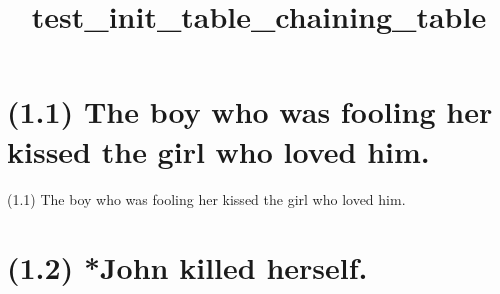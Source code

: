 \documentclass{article}
\begin{document}
%
%

\title{\textbf{test\_init\_table\_chaining\_table}}
\maketitle

\clearpage

%
%

\section*{(1.1) The boy who was fooling her kissed the girl who loved him.}

\bigbreak
\begin{enumerate*}
\item[(1.1)] The boy who was fooling her kissed the girl who loved him.
\end{enumerate*}
\bigbreak

\bigbreak
\begin{minipage}{\textwidth}
\end{minipage}
\bigbreak

\clearpage

%
%

\section*{(1.2) *John killed herself.}
\end{document}
